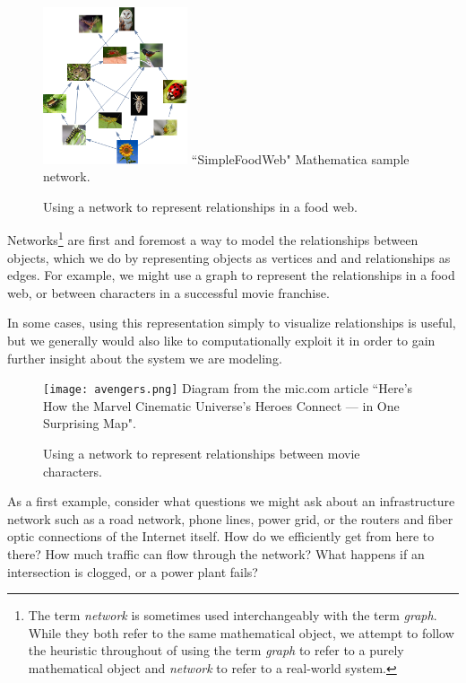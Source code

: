 \documentclass[12pt]{thesis}
\theoremstyle{plain}
\theoremstyle{definition}
\theoremstyle{remark}
\begin{document}
\begin{figure}
\centering
\vspace{-20pt}
\includegraphics[width=0.38\textwidth]{foodweb.png}
\scriptsize
``SimpleFoodWeb" Mathematica sample network.
\caption{Using a network to represent relationships in a food web.}
\vspace{-20pt}
\label{fig:foodweb}
\end{figure}

Networks\footnote{The term \textit{network} is sometimes used interchangeably with the term \textit{graph}. While they both refer to the same mathematical object, we attempt to follow the heuristic throughout of using the term \textit{graph} to refer to a purely mathematical object and \textit{network} to refer to a real-world system.} are first and foremost a way to model the relationships between objects, which we do by representing objects as vertices and and relationships as edges. For example, we might use a graph to represent the relationships in a food web, or between characters in a successful movie franchise.

In some cases, using this representation simply to visualize relationships is useful, but we generally would also like to computationally exploit it in order to gain further insight about the system we are modeling. 


\begin{figure}
\centering
\vspace{-25pt}
\texttt{[image: avengers.png]}
\scriptsize
Diagram from the mic.com article ``Here's How the Marvel Cinematic Universe's Heroes Connect — in One Surprising Map".
\caption{Using a network to represent relationships between movie characters.}
\vspace{-20pt}
\label{fig:avengers}
\end{figure}

As a first example, consider what questions we might ask about an infrastructure network such as a road network, phone lines, power grid, or the routers and fiber optic connections of the Internet itself. How do we efficiently get from here to there? How much traffic can flow through the network? What happens if an intersection is clogged, or a power plant fails? 
\end{document}
